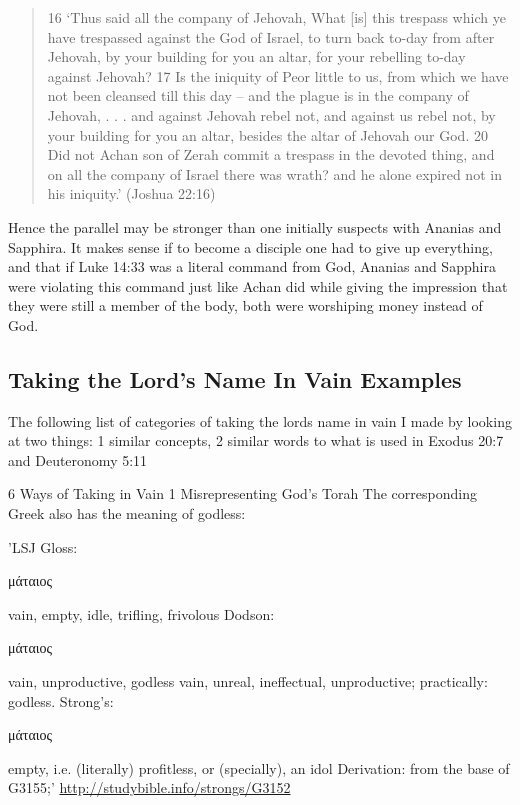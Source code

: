 \documentclass[11pt]{article}
\begin{document}
\begin{quote}
16 `Thus said all the company of Jehovah, What [is] this trespass which ye have trespassed against the God of Israel, to turn back to-day from after Jehovah, by your building for you an altar, for your rebelling to-day against Jehovah?
17 Is the iniquity of Peor little to us, from which we have not been cleansed till this day -- and the plague is in the company of Jehovah, . . .  and against Jehovah rebel not, and against us rebel not, by your building for you an altar, besides the altar of Jehovah our God.
20 Did not Achan son of Zerah commit a trespass in the devoted thing, and on all the company of Israel there was wrath? and he alone expired not in his iniquity.' (Joshua 22:16)
\end{quote}
Hence the parallel may be stronger than one initially suspects with Ananias and Sapphira. It makes sense if to become a disciple one had to give up everything, and that if Luke 14:33 was a literal command from God, Ananias and Sapphira were violating this command just like Achan did while giving the impression that they were still a member of the body, both were worshiping money instead of God.

\subsection{Taking the Lord's Name In Vain Examples}
The following list of categories of taking the lords name in vain I made by looking at two things: 1 similar concepts, 2 similar words to what is used in Exodus 20:7 and Deuteronomy 5:11

{\LARGE 6 Ways of Taking in Vain}\newline
{\Large 1 Misrepresenting God's Torah}\newline
The corresponding Greek also has the meaning of godless:\newline

'LSJ Gloss:\newline
\begin{greek}μάταιος\end{greek}\newline
vain, empty, idle, trifling, frivolous\newline
Dodson:\newline
\begin{greek}μάταιος\end{greek}\newline
vain, unproductive, godless\newline
vain, unreal, ineffectual, unproductive; practically: godless.\newline
Strong's:\newline
\begin{greek}μάταιος\end{greek}\newline
empty, i.e. (literally) profitless, or (specially), an idol\newline
Derivation: from the base of G3155;'\newline
\url{http://studybible.info/strongs/G3152}\newline
\end{document}
